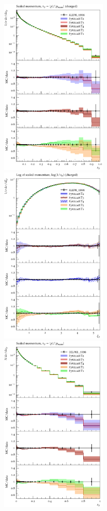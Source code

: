 \documentclass[aps,preprint,floatfix,nofootinbib,showpacs]{revtex4-1}
\begin{document}
 
\begin{figure}[btp]
 \centering
 \includegraphics[width=8cm, height=9cm]{ALEPH_1996/d09-x01-y01.pdf}
 \hfill
  \includegraphics[width=8cm, height=9cm]{ALEPH_1996/d17-x01-y01.pdf}
  \vfill
     \includegraphics[width=8cm, height=9cm]{DELPHI_1996/d07-x01-y01.pdf}

\end{figure}
\end{document}
